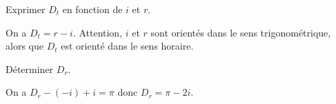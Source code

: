 	
	\debutEntrainement
	
	
	
	\begin{enonce}
		Exprimer $D_t$ en fonction de $i$ et $r$.
	\end{enonce}
	
	
	\begin{corrige}
		On a $D_t=r-i$. Attention, $i$ et $r$ sont orientés dans le sens trigonométrique, alors que $D_t$ est orienté dans le sens horaire.
	\end{corrige}
	
	
	
	\begin{enonce}
		Déterminer $D_r$.
	\end{enonce}
	
	
	\begin{corrige}
		On a $D_r-(-i)+i=\pi$ donc $D_r=\pi-2i$.
	\end{corrige}
	
	
	\finEntrainement
	
	



	
	
	\hauteurLargeurCadreReponse		{8mm}{4cm}
	\typeEntrainement				{} %
	\initialisationEntrainement
	
